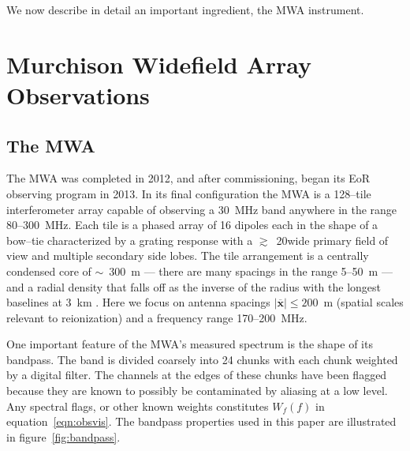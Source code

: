 \documentclass[preprint2,iop,numberedappendix]{emulateapj}
\begin{document}
We now describe in detail an important ingredient, the MWA instrument.

\section{Murchison Widefield Array Observations}\label{sec:instrument}

\subsection{The MWA}

The MWA was completed in 2012, and after commissioning, began its EoR observing program in 2013. In its final configuration the MWA is a 128--tile interferometer array capable of observing a 30~MHz band anywhere in the range 80--300~MHz. Each tile is a phased array of 16 dipoles each in the shape of a bow--tie characterized by a grating response with a $\gtrsim$~20\arcdeg wide primary field of view and multiple secondary side lobes. The tile arrangement is a centrally condensed core of $\sim$~300~m --- there are many spacings in the range 5--50~m --- and a radial density that falls off as the inverse of the radius with the longest baselines at 3~km \citep{bea12}. Here we focus on antenna spacings $|\overline{\mathbf{x}}| \le 200$~m (spatial scales relevant to reionization) and a frequency range 170--200~MHz.

One important feature of the MWA's measured spectrum is the shape of its bandpass. The band is divided coarsely into 24 chunks with each chunk weighted by a digital filter. The channels at the edges of these chunks have been flagged because they are known to possibly be contaminated by aliasing at a low level. Any spectral flags, or other known weights constitutes $W_f(f)$ in equation~\ref{eqn:obsvis}. The bandpass properties used in this paper are illustrated in figure~\ref{fig:bandpass}. 
\end{document}

